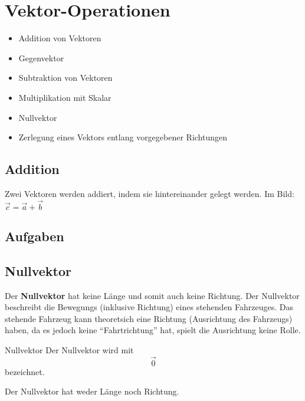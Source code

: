 \section{Vektor-Operationen}

\begin{itemize}
\item Addition von Vektoren
\item Gegenvektor
\item Subtraktion von Vektoren
\item Multiplikation mit Skalar
\item Nullvektor
\item Zerlegung eines Vektors entlang vorgegebener Richtungen
\end{itemize}

\newpage

\subsection{Addition}

Zwei Vektoren werden addiert, indem sie hintereinander gelegt
werden. Im Bild: $\vec{c} = \vec{a} + \vec{b}$


\subsection*{Aufgaben}

\newpage

\subsection{Nullvektor}

Der \textbf{Nullvektor} hat keine Länge und somit auch keine
Richtung. Der Nullvektor beschreibt \zB die Bewegungs (inklusive
Richtung) eines stehenden Fahrzeuges.
Das stehende Fahrzeug kann theoretsich eine Richtung (Ausrichtung des
Fahrzeugs) haben, da es jedoch keine ``Fahrtrichtung'' hat, spielt die
Ausrichtung keine Rolle.

\begin{definition}{Nullvektor}{}
  Der Nullvektor wird mit
  $$\vec{0}$$
  bezeichnet.

  Der Nullvektor hat weder Länge noch Richtung.
  
  \end{definition}
\newpage


